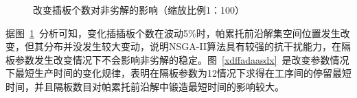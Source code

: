 \documentclass{whutmod}
\begin{document}
 \begin{figure}[H]	
 	\centering
 	\caption{改变插板个数对非劣解的影响（缩放比例1：100）}
 	\label{fisadssassg}
 \end{figure}
 据图~\ref{fisadssassg}~分析可知，变化插插板个数在波动5\%时，帕累托前沿解集空间位置发生改变，但其分布并没发生较大变动，说明NSGA-II算法具有较强的抗干扰能力，在隔板参数发生改变情况下不会影响非劣解的稳定。图~\ref{xdffadaasdx}~是改变参数情况下最短生产时间的变化规律，表明在隔板参数为12情况下求得在工序间的停留最短时间，并且隔板数目对帕累托前沿解中锻造最短时间的影响较大。
 
\end{document}
